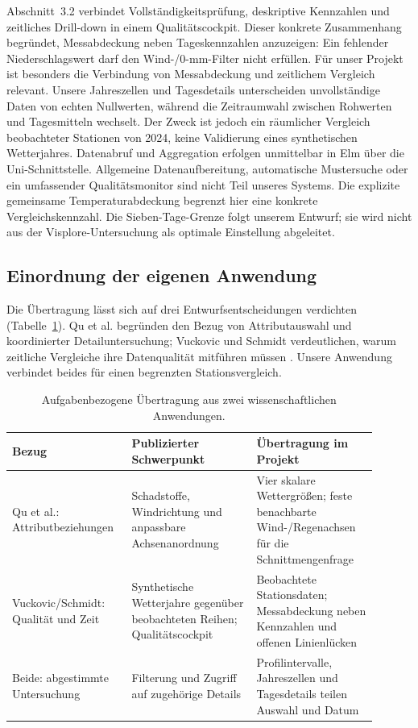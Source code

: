 \documentclass[usegeometry=true]{scrartcl}
\begin{document}
Abschnitt~3.2 verbindet Vollständigkeitsprüfung, deskriptive Kennzahlen
und zeitliches Drill-down in einem Qualitätscockpit. Dieser konkrete
Zusammenhang begründet, Messabdeckung neben Tageskennzahlen anzuzeigen:
Ein fehlender Niederschlagswert darf den Wind-/0-mm-Filter nicht erfüllen.
Für unser Projekt ist besonders die Verbindung von Messabdeckung und
zeitlichem Vergleich relevant. Unsere Jahreszellen und Tagesdetails
unterscheiden unvollständige Daten von echten Nullwerten, während die
Zeitraumwahl zwischen Rohwerten und Tagesmitteln wechselt. Der Zweck ist
jedoch ein räumlicher Vergleich beobachteter Stationen von 2024, keine
Validierung eines synthetischen Wetterjahres. Datenabruf und Aggregation
erfolgen unmittelbar in Elm über die Uni-Schnittstelle. Allgemeine
Datenaufbereitung, automatische Mustersuche oder ein umfassender
Qualitätsmonitor sind nicht Teil unseres Systems. Die explizite gemeinsame
Temperaturabdeckung begrenzt hier eine konkrete Vergleichskennzahl.
Die Sieben-Tage-Grenze folgt unserem Entwurf; sie wird nicht aus der
Visplore-Untersuchung als optimale Einstellung abgeleitet.

\subsection{Einordnung der eigenen Anwendung}
Die Übertragung lässt sich auf drei Entwurfsentscheidungen verdichten
(Tabelle~\ref{tab:related-transfer}). Qu et al. begründen den Bezug von
Attributauswahl und koordinierter Detailuntersuchung; Vuckovic und Schmidt
verdeutlichen, warum zeitliche Vergleiche ihre Datenqualität mitführen
müssen \autocite{qu2007pollution,vuckovic2020meteorological}. Unsere
Anwendung verbindet beides für einen begrenzten Stationsvergleich.

\begin{table}[htbp]
  \centering\small
  \begin{tabular}{>{\raggedright\arraybackslash}p{0.27\linewidth}>{\raggedright\arraybackslash}p{0.32\linewidth}>{\raggedright\arraybackslash}p{0.31\linewidth}}
    Bezug & Publizierter Schwerpunkt & Übertragung im Projekt \\
    \hline
    Qu et al.: Attributbeziehungen & Schadstoffe, Windrichtung und anpassbare Achsenanordnung & Vier skalare Wettergrößen; feste benachbarte Wind-/Regenachsen für die Schnittmengenfrage \\
    Vuckovic/Schmidt: Qualität und Zeit & Synthetische Wetterjahre gegenüber beobachteten Reihen; Qualitätscockpit & Beobachtete Stationsdaten; Messabdeckung neben Kennzahlen und offenen Linienlücken \\
    Beide: abgestimmte Untersuchung & Filterung und Zugriff auf zugehörige Details & Profilintervalle, Jahreszellen und Tagesdetails teilen Auswahl und Datum \\
  \end{tabular}
  \caption{Aufgabenbezogene Übertragung aus zwei wissenschaftlichen Anwendungen.}
  \label{tab:related-transfer}
\end{table}
\end{document}
